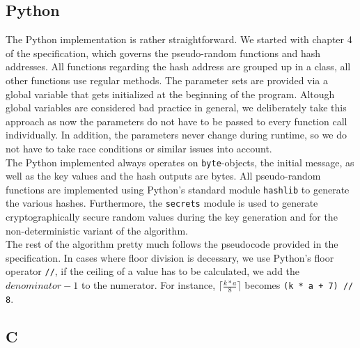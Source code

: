 \documentclass[journal=tosc,notanonymous]{iacrtrans}
\begin{document}
\subsection{Python}

The Python implementation is rather straightforward.
We started with chapter 4 of the specification, which governs the pseudo-random functions and hash addresses.
All functions regarding the hash address are grouped up in a class, all other functions use regular methods.
The parameter sets are provided via a global variable that gets initialized at the beginning of the program.
Altough global variables are considered bad practice in general, we deliberately take this approach as now the parameters do not have to be passed to every function call individually.
In addition, the parameters never change during runtime, so we do not have to take race conditions or similar issues into account.
\\
The Python implemented always operates on \texttt{byte}-objects, the initial message, as well as the key values and the hash outputs are bytes.
All pseudo-random functions are implemented using Python's standard module \texttt{hashlib} to generate the various hashes.
Furthermore, the \texttt{secrets} module is used to generate cryptographically secure random values during the key generation and for the non-deterministic variant of the algorithm.
\\
The rest of the algorithm pretty much follows the pseudocode provided in the specification.
In cases where floor division is decessary, we use Python's floor operator \texttt{//}, if the ceiling of a value has to be calculated, we add the $denominator - 1$ to the numerator.
For instance, $\lceil \frac{k * a}{8} \rceil$ becomes \texttt{(k * a + 7) // 8}.


\subsection{C}
\end{document}
